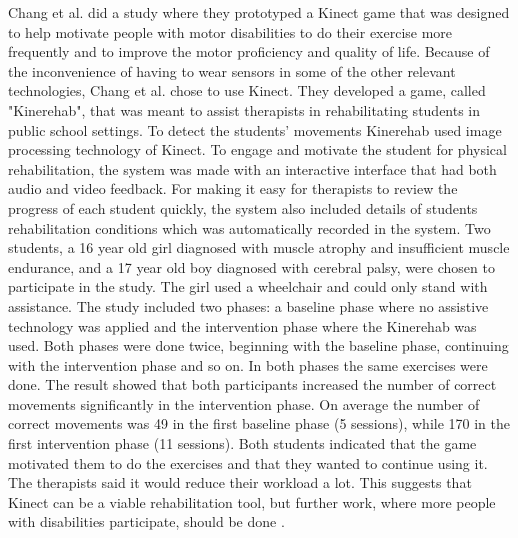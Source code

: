 Chang et al. \cite{kinect} did a study where they prototyped a Kinect game that was designed to help motivate people with motor disabilities to do their exercise more frequently and to improve the motor proficiency and quality of life. Because of the inconvenience of having to wear sensors in some of the other relevant technologies, Chang et al. chose to use Kinect. They developed a game, called "Kinerehab", that was meant to assist therapists in rehabilitating students in public school settings. To detect the students’ movements Kinerehab used image processing technology of Kinect. To engage and motivate the student for physical rehabilitation, the system was made with an interactive interface that had both audio and video feedback. For making it easy for therapists to review the progress of each student quickly, the system also included details of students rehabilitation conditions which was automatically recorded in the system. Two students, a 16 year old girl diagnosed with  muscle atrophy and insufficient muscle endurance, and a 17 year old boy diagnosed with cerebral palsy, were chosen to participate in the study. The girl used a wheelchair and could only stand with assistance. The study included two phases: a baseline phase  where no assistive technology was applied and the intervention phase where the Kinerehab was used. Both phases were done twice, beginning with the baseline phase, continuing with the intervention phase and so on. In both phases the same exercises were done. The result showed that both participants increased the number of correct movements significantly in the intervention phase. On average the number of correct movements was 49 in the first baseline phase (5 sessions), while 170 in the first intervention phase (11 sessions). Both students indicated that the game motivated them to do the exercises and that they wanted to continue using it. The therapists said it would reduce their workload a lot. This suggests that Kinect can be a viable rehabilitation tool, but further work, where more people with disabilities participate, should be done \cite{kinect}. \\ \\ 
